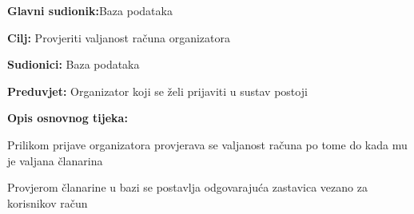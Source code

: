 				\noindent {}
				\begin{packed_item}
					
					\item \textbf{Glavni sudionik:}Baza podataka
					\item  \textbf{Cilj:} Provjeriti valjanost računa organizatora
					\item  \textbf{Sudionici:} Baza podataka
					\item  \textbf{Preduvjet:} Organizator koji se želi prijaviti u sustav postoji
					\item  \textbf{Opis osnovnog tijeka:}
					
					\item[] \begin{packed_enum}
						
						\item Prilikom prijave organizatora provjerava se valjanost računa po tome do kada mu je valjana članarina
						\item Provjerom članarine u bazi se postavlja odgovarajuća zastavica vezano za korisnikov račun
					\end{packed_enum}
					
				\end{packed_item}
				
				
				
